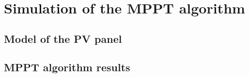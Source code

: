 
\section{Simulation of the MPPT algorithm} \label{MPPTSimulation}
\subsection{Model of the PV panel}
\subsection{MPPT algorithm results}


